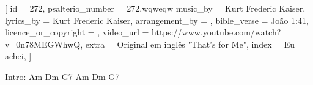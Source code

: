 
[
    id                     = {272},
    psalterio_number       = {272},wqweqw
    music_by               = {Kurt Frederic Kaiser},
    lyrics_by              = {Kurt Frederic Kaiser},
    arrangement_by         = {},
    bible_verse            = {João 1:41},
    licence_or_copyright   = {},
    video_url              = {https://www.youtube.com/watch?v=0n78MEGWhwQ},
    extra                  = {Original em inglês "That's for Me"},
    index 		             = {Eu achei},
]


\beginverse

Intro: 
Am Dm G7
Am Dm G7

\endverse


\beginverse

